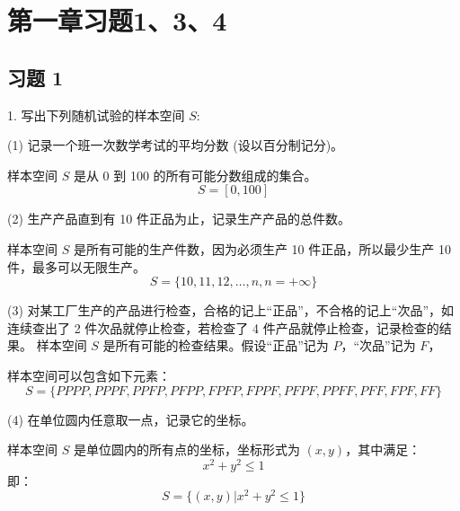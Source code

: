 \documentclass[twoside]{article}
\begin{document}
\maketitle
\vspace{-3.5em}

\tableofcontents

\section{第一章习题1、3、4}

\subsection{习题 1}

1. 写出下列随机试验的样本空间 \( S \):

(1) 记录一个班一次数学考试的平均分数 (设以百分制记分)。  

\begin{ans}{1}{1}

样本空间 \( S \) 是从 0 到 100 的所有可能分数组成的集合。
\[
S = [0, 100]
\]
\end{ans}

(2) 生产产品直到有 10 件正品为止，记录生产产品的总件数。  

\begin{ans}{2}{2}
    
样本空间 \( S \) 是所有可能的生产件数，因为必须生产 10 件正品，所以最少生产 10 件，最多可以无限生产。
\[
S = \{10, 11, 12, \dots, n, n = +\infty \}
\]

\end{ans}

(3) 对某工厂生产的产品进行检查，合格的记上“正品”，不合格的记上“次品”，如连续查出了 2 件次品就停止检查，若检查了 4 件产品就停止检查，记录检查的结果。  
样本空间 \( S \) 是所有可能的检查结果。假设“正品”记为 \( P \)，“次品”记为 \( F \)，

\begin{ans}{3}{3}

    样本空间可以包含如下元素：
\[
S = \{PPPP, PPPF, PPFP, PFPP, FPFP, FPPF, PFPF, PPFF, PFF, FPF, FF \}
\]

\end{ans}

(4) 在单位圆内任意取一点，记录它的坐标。

\begin{ans}{4}{4}

样本空间 \( S \) 是单位圆内的所有点的坐标，坐标形式为 \( (x, y) \)，其中满足：
\[
x^2 + y^2 \leq 1
\]
即：
\[
S = \{(x, y) | x^2 + y^2 \leq 1 \}
\]

\end{ans}
\end{document}
